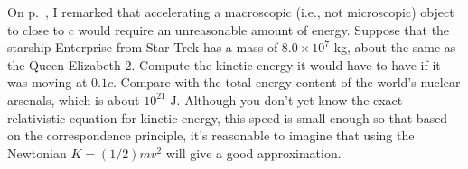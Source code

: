 %
On p.~\pageref{rel-spaceship-impractical}, 
I remarked that accelerating a macroscopic
(i.e., not microscopic) object to close to $c$ would require an unreasonable amount of energy.
Suppose that the starship Enterprise from Star Trek has a mass
of $8.0\times10^7$ kg, about the same as the Queen Elizabeth 2.
Compute the kinetic energy it would have to have if it
was moving at $0.1c$. Compare with the total
energy content of the world's nuclear arsenals, which is about $10^{21}$ J.
Although you don't yet know the exact relativistic equation for kinetic energy, this
speed is small enough so that based on the correspondence principle,
it's reasonable to imagine that using the Newtonian
$K=(1/2)mv^2$ will give a good approximation.\answercheck
